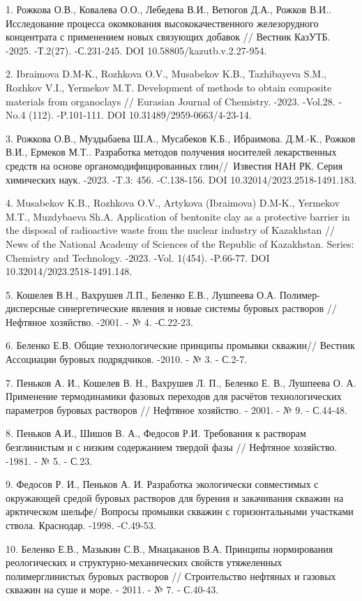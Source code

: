 \begin{refs}
1. Рожкова О.В., Ковалева О.О., Лебедева В.И., Ветюгов Д.А., Рожков
В.И.. Исследование процесса окомкования высококачественного
железорудного концентрата с применением новых связующих добавок //
Вестник КазУТБ. -2025. -Т.2(27). -С.231-245. DOI
10.58805/kazutb.v.2.27-954.

2. Ibraimova D.M-K., Rozhkova O.V., Musabekov K.B., Tazhibayeva S.M.,
Rozhkov V.I., Yermekov M.T. Development of methods to obtain composite
materials from organoclays // Eurasian Journal of Chemistry. -2023.
-Vol.28. -No.4 (112). -P.101-111. DOI 10.31489/2959-0663/4-23-14.

3. Рожкова О.В., Муздыбаева Ш.А., Мусабеков К.Б., Ибраимова. Д.М.-К.,
Рожков В.И., Ермеков М.Т.. Разработка методов получения носителей
лекарственных средств на основе органомодифицированных глин//~Известия
НАН РК. Серия химических наук. -2023. -T.3: 456. -C.138-156. DOI
10.32014/2023.2518-1491.183.

4. Musabekov K.B., Rozhkova O.V., Artykova (Ibraimova) D.M-K., Yermekov
M.T., Muzdybaeva Sh.A. Application of bentonite clay as a protective
barrier in the disposal of radioactive waste from the nuclear industry
of Kazakhstan // News of the National Academy of Sciences of the
Republic of Kazakhstan. Series: Chemistry and Technology. -2023. -Vol.
1(454). -P.66-77. DOI 10.32014/2023.2518-1491.148.

5. Кошелев В.Н., Вахрушев Л.П., Беленко Е.В., Лушпеева О.А.
Полимер-дисперсные синергетические явления и новые системы буровых
растворов // Нефтяное хозяйство. -2001. - № 4. -С.22-23.

6. Беленко Е.В. Общие технологические принципы промывки скважин//
Вестник Ассоциации буровых подрядчиков. -2010. - № 3. - С.2-7.

7. Пеньков А. И., Кошелев В. Н., Вахрушев Л. П., Беленко Е. В., Лушпеева
О. А. Применение термодинамики фазовых переходов для расчётов
технологических параметров буровых растворов // Нефтяное хозяйство. -
2001. - № 9. - С.44-48.

8. Пеньков А.И., Шишов В. А., Федосов Р.И. Требования к растворам
безглинистым и с низким содержанием твердой фазы // Нефтяное хозяйство.
-1981. - № 5. - С.23.

9. Федосов Р. И., Пеньков А. И. Разработка экологически совместимых с
окружающей средой буровых растворов для бурения и закачивания скважин на
арктическом шельфе/ Вопросы промывки скважин с горизонтальными участками
ствола. Краснодар. -1998. -C.49-53.

10. Беленко Е.В., Мазыкин С.В., Мнацаканов В.А. Принципы нормирования
реологических и структурно-механических свойств утяжеленных
полимерглинистых буровых растворов // Строительство нефтяных и газовых
скважин на суше и море. - 2011. - № 7. - С.40-43.
\end{refs}


